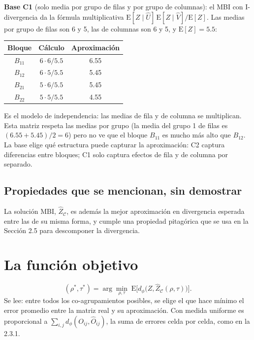 \documentclass[11pt,a4paper]{article}
\begin{document}
\textbf{Base C1} (solo media por grupo de filas y por grupo de columnas): el MBI
con I-divergencia da la fórmula multiplicativa
$\mathrm{E}[Z\mid\hat U]\,\mathrm{E}[Z\mid\hat V]/\mathrm{E}[Z]$. Las medias por
grupo de filas son 6 y 5, las de columnas son 6 y 5, y $\mathrm{E}[Z]=5.5$:
\begin{center}
\begin{tabular}{ccc}
\toprule
Bloque & Cálculo & Aproximación \\
\midrule
$B_{11}$ & $6\cdot6/5.5$ & 6.55 \\
$B_{12}$ & $6\cdot5/5.5$ & 5.45 \\
$B_{21}$ & $5\cdot6/5.5$ & 5.45 \\
$B_{22}$ & $5\cdot5/5.5$ & 4.55 \\
\bottomrule
\end{tabular}
\end{center}
Es el modelo de independencia: las medias de fila y de columna se multiplican. Esta
matriz respeta las medias por grupo (la media del grupo 1 de filas es
$(6.55+5.45)/2=6$) pero no ve que el bloque $B_{11}$ es mucho más alto que
$B_{12}$. La base elige qué estructura puede capturar la aproximación: C2 captura
diferencias entre bloques; C1 solo captura efectos de fila y de columna por
separado.

\subsection{Propiedades que se mencionan, sin demostrar}

La solución MBI, $\hat Z_{\mathcal C}$, es además la mejor aproximación en
divergencia esperada entre las de su misma forma, y cumple una propiedad
pitagórica que se usa en la Sección 2.5 para descomponer la divergencia.

\section{La función objetivo}

\[
  (\rho^*,\tau^*)=\arg\min_{\rho,\tau}\;\mathrm{E}\bigl[d_\phi\bigl(Z,\hat Z_{\mathcal C}(\rho,\tau)\bigr)\bigr].
\]
Se lee: entre todos los co-agrupamientos posibles, se elige el que hace mínimo el
error promedio entre la matriz real y su aproximación. Con medida uniforme es
proporcional a $\sum_{i,j}d_\phi(O_{ij},\hat O_{ij})$, la suma de errores celda por
celda, como en la 2.3.1.
\end{document}
